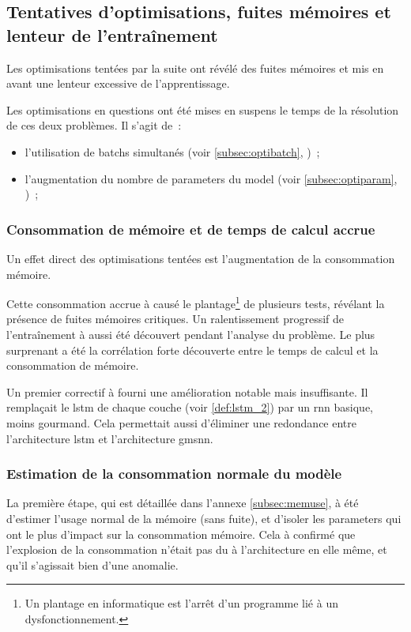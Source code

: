 \subsection{Tentatives d'optimisations, fuites mémoires et lenteur de l'entraînement}\label{subsec:optimem}

Les optimisations tentées par la suite ont révélé des fuites mémoires et mis en avant une lenteur excessive de l'apprentissage.

Les optimisations en questions ont été mises en suspens le temps de la résolution de ces deux problèmes.
Il s'agit de~:
\begin{itemize}
	\item l'utilisation de \glspl{batch} simultanés (voir \autoref{subsec:optibatch}, )~; 
	\item l'augmentation du nombre de \glspl{parameter} du \gls{model} (voir \autoref{subsec:optiparam}, )~;
\end{itemize}

\subsubsection{Consommation de mémoire et de temps de calcul accrue}
Un effet direct des optimisations tentées est l'augmentation de la consommation mémoire.

Cette consommation accrue à causé le plantage\footnote{Un plantage en informatique est l'arrêt d'un programme lié à un dysfonctionnement.} de plusieurs tests, révélant la présence de fuites mémoires critiques.
Un ralentissement progressif de l'entraînement à aussi été découvert pendant l'analyse du problème.
Le plus surprenant a été la corrélation forte découverte entre le temps de calcul et la consommation de mémoire.

Un premier correctif à fourni une amélioration notable mais insuffisante.
Il remplaçait le \gls{lstm} de chaque couche (voir \autoref{def:lstm_2}) par un \gls{rnn} basique, moins gourmand. Cela permettait aussi d'éliminer une redondance entre l'architecture \gls{lstm} et l'architecture \gls{gmsnn}.

\subsubsection{Estimation de la consommation normale du modèle}
La première étape, qui est détaillée dans l'annexe \ref{subsec:memuse}, à été d'estimer l'usage normal de la mémoire (sans fuite), et d'isoler les \glspl{parameter} qui ont le plus d'impact sur la consommation mémoire.
Cela à confirmé que l'explosion de la consommation n'était pas du à l'architecture en elle même, et qu'il s'agissait bien d'une anomalie.

